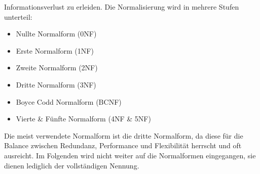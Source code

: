 Informationsverlust zu erleiden. Die Normalisierung wird in mehrere Stufen unterteil:
\begin{itemize}
    \item Nullte Normalform (0NF)
    \item Erste Normalform (1NF)
    \item Zweite Normalform (2NF)
    \item Dritte Normalform (3NF)
    \item Boyce Codd Normalform (BCNF)
    \item Vierte \& Fünfte Normalform (4NF \& 5NF)
\end{itemize} 
Die meist verwendete Normalform ist die dritte Normalform, da diese für die Balance zwischen Redundanz, Performance und Flexibilität 
herrscht und oft ausreicht. Im Folgenden wird nicht weiter auf die Normalformen eingegangen, sie dienen lediglich der vollständigen Nennung. 